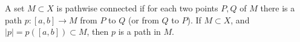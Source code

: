 A set $M \subset X$ is pathwise connected if for each two points $P, Q$ of $M$ there is a path $p: [a, b] \rightarrow M$ from $P$ to $Q$ (or from $Q$ to $P$). If $M \subset X$, and $|p| = p([a, b]) \subset M$, then $p$ is a path in $M$.
